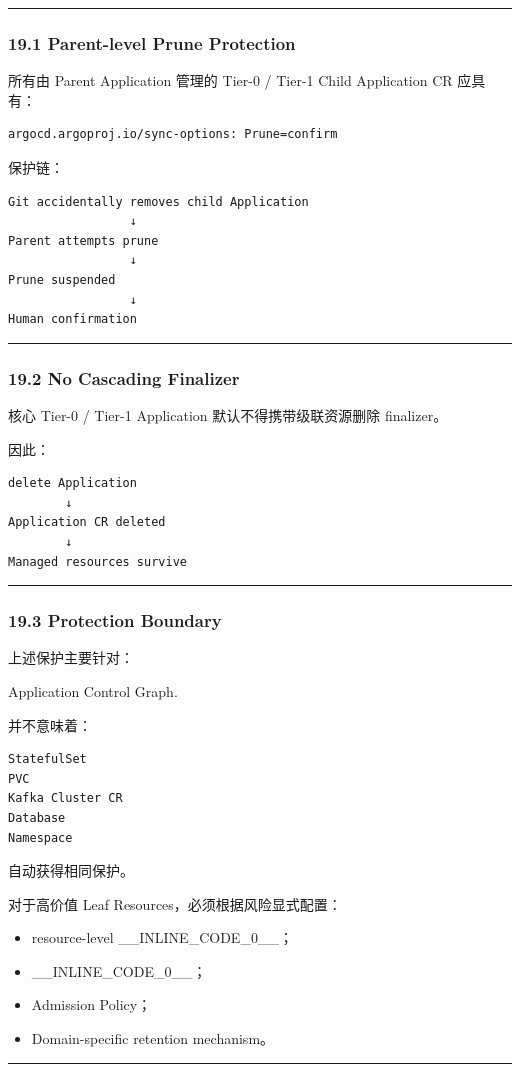\documentclass[11pt,a4paper]{article}
\begin{document}
\vspace{0.5em}\hrule\vspace{0.5em}
\subsubsection{19.1 Parent-level Prune Protection}
所有由 Parent Application 管理的 Tier-0 / Tier-1 Child Application CR 应具有：

\begin{lstlisting}[language=text]
argocd.argoproj.io/sync-options: Prune=confirm
\end{lstlisting}
保护链：

\begin{lstlisting}[language=text]
Git accidentally removes child Application
                 ↓
Parent attempts prune
                 ↓
Prune suspended
                 ↓
Human confirmation
\end{lstlisting}
\vspace{0.5em}\hrule\vspace{0.5em}
\subsubsection{19.2 No Cascading Finalizer}
核心 Tier-0 / Tier-1 Application 默认不得携带级联资源删除 finalizer。

因此：

\begin{lstlisting}[language=text]
delete Application
        ↓
Application CR deleted
        ↓
Managed resources survive
\end{lstlisting}
\vspace{0.5em}\hrule\vspace{0.5em}
\subsubsection{19.3 Protection Boundary}
上述保护主要针对：

\begin{gfmBlockquote}
Application Control Graph.
\end{gfmBlockquote}
并不意味着：

\begin{lstlisting}[language=text]
StatefulSet
PVC
Kafka Cluster CR
Database
Namespace
\end{lstlisting}
自动获得相同保护。

对于高价值 Leaf Resources，必须根据风险显式配置：

\begin{itemize}
  \item resource-level \_\_INLINE\_CODE\_0\_\_；
  \item \_\_INLINE\_CODE\_0\_\_；
  \item Admission Policy；
  \item Domain-specific retention mechanism。
\end{itemize}
\vspace{0.5em}\hrule\vspace{0.5em}
\end{document}
